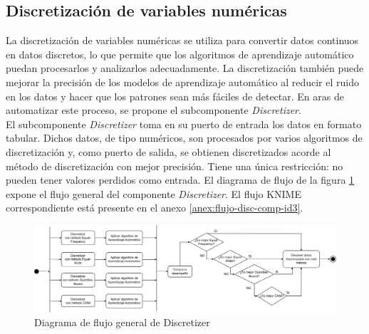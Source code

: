\subsection{Discretización de variables numéricas} 
La discretización de variables numéricas se utiliza para convertir datos continuos en datos discretos, lo que permite que los algoritmos de aprendizaje automático puedan procesarlos y analizarlos adecuadamente. La discretización también puede mejorar la precisión de los modelos de aprendizaje automático al reducir el ruido en los datos y hacer que los patrones sean más fáciles de detectar. En aras de automatizar este proceso, se propone el subcomponente \textit{Discretizer}. \\
El subcomponente \textit{Discretizer} toma en su puerto de entrada los datos en formato tabular. Dichos datos, de tipo numéricos, son procesados por varios algoritmos de discretización y, como puerto de salida, se obtienen discretizados acorde al método de discretización con mejor precisión. Tiene una única restricción: no pueden tener valores perdidos como entrada. El diagrama de flujo de la figura \ref{fig:discretizacion} expone el flujo general del componente \textit{Discretizer}. El flujo KNIME correspondiente está presente en el anexo \ref{anex:flujo-disc-comp-id3}. 

\begin{figure}[H]
	\centering
	\includegraphics[width=1\linewidth]{"figuras/capi 2/preprocesado/discretizacion.drawio"}
	\caption{Diagrama de flujo general de Discretizer}
	\label{fig:discretizacion}
\end{figure}

